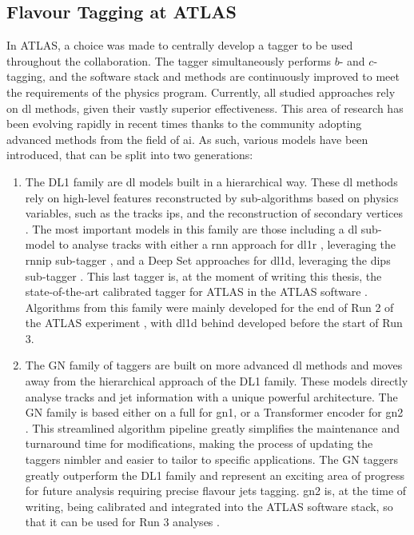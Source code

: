 \subsection{Flavour Tagging at ATLAS}
In ATLAS, a choice was made to centrally develop a tagger to be used throughout the collaboration. The tagger simultaneously performs $b$- and $c$-tagging, and the software stack and methods are continuously improved to meet the requirements of the physics program. Currently, all studied approaches rely on \gls{dl} methods, given their vastly superior effectiveness. This area of research has been evolving rapidly in recent times thanks to the community adopting advanced methods from the field of \gls{ai}. As such, various models have been introduced, that can be split into two generations: 
\begin{enumerate}
  \item The DL1 family are \gls{dl} models built in a hierarchical way. These \gls{dl} methods rely on high-level features reconstructed by sub-algorithms based on physics variables, such as the tracks \glspl{ip}, and the reconstruction of secondary vertices \cite{ATL-PHYS-PUB-2015-022}. The most important models in this family are those including a \gls{dl} sub-model to analyse tracks with either a \gls{rnn} approach for \gls{dl1r} \cite{ATLAS:2017bcq}, leveraging the \gls{rnnip} sub-tagger \cite{ATL-PHYS-PUB-2017-003}, and a Deep Set approaches for \gls{dl1d}, leveraging the \gls{dips} sub-tagger \cite{ATL-PHYS-PUB-2020-014}. This last tagger is, at the moment of writing this thesis, the state-of-the-art calibrated tagger for ATLAS in the ATLAS software \cite{ATL-SOFT-PUB-2021-001}. Algorithms from this family were mainly developed for the end of Run 2 of the ATLAS experiment \cite{atlas:FTAGRUN2}, with \gls{dl1d} behind developed before the start of Run 3.
  \item The GN family of taggers are built on more advanced \gls{dl} methods and moves away from the hierarchical approach of the DL1 family. These models directly analyse tracks and jet information with a unique powerful architecture. The GN family is based either on a full  for \gls{gn1}, or a Transformer encoder for \gls{gn2} \cite{ATL-PHYS-PUB-2022-027, ATL-PLOT-FTAG-2023-01, duperrin2023flavour}. This streamlined algorithm pipeline greatly simplifies the maintenance and turnaround time for modifications, making the process of updating the taggers nimbler and easier to tailor to specific applications. The GN taggers greatly outperform the DL1 family and represent an exciting area of progress for future analysis requiring precise flavour jets tagging. \gls{gn2} is, at the time of writing, being calibrated and integrated into the ATLAS software stack, so that it can be used for Run 3 analyses \cite{ATL-SOFT-PUB-2021-001}.  
\end{enumerate}

